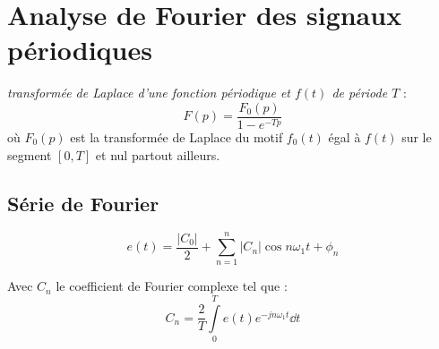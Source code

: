 \chapter[Analyse de Fourier]
{Analyse de Fourier des signaux périodiques\label{annexe-seriefourier}}
\emph{transformée de Laplace d'une fonction périodique et $f(t)$ de 
période $T$} :
\[
        F(p) = \dfrac{F_0(p)}{1-e^{-Tp}}
\]
où $F_0(p)$ est la transformée de Laplace du motif $f_0(t)$ égal à 
$f(t)$ sur le segment $[0,T]$ et nul partout ailleurs.


\section{Série de Fourier}

\[
    e(t)= \dfrac{|C_0|}{2}+\sum\limits_{n=1}^n |C_n|\cos{n\omega_1 t+\phi_n}
\]

Avec $C_n$ le coefficient de Fourier complexe tel que :
\[
    C_n=\dfrac{2}{T}\int\limits_0^T e(t)e^{-jn\omega_1 t}\dd{t}
\]
